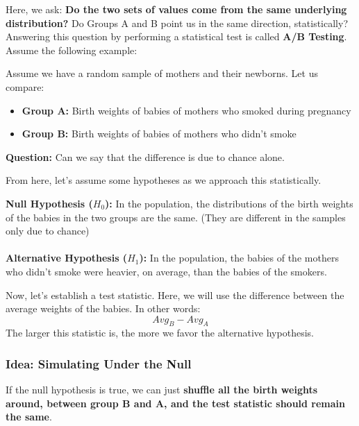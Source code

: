 \documentclass[english, 10pt]{article}
\begin{document}
Here, we ask: \textbf{Do the two sets of values come from the same underlying distribution?} Do Groups A and B point us in the same direction, statistically?\\

Answering this question by performing a statistical test is called \textbf{A/B Testing}.\\

Assume the following example:\\

\begin{myproof}
Assume we have a random sample of mothers and their newborns. Let us compare:
\begin{itemize}
	\item \textbf{Group A:} Birth weights of babies of mothers who smoked during pregnancy
	\item \textbf{Group B:} Birth weights of babies of mothers who didn't smoke
\end{itemize}

\textbf{Question:} Can we say that the difference is due to chance alone.
\end{myproof}

\hfill \break From here, let's assume some hypotheses as we approach this statistically.\\

\begin{myproof}
\textbf{Null Hypothesis ($H_0$):} In the population, the distributions of the birth weights of the babies in the two groups are the same. (They are different in the samples only due to chance)\\\\
\textbf{Alternative Hypothesis ($H_1$):} In the population, the babies of the mothers who didn't smoke were heavier, on average, than the babies of the smokers.
\end{myproof}

\hfill \break Now, let's establish a test statistic. Here, we will use the difference between the average weights of the babies. In other words: $$ Avg_{B} - Avg_{A} $$ The larger this statistic is, the more we favor the alternative hypothesis.\\

\subsubsection{Idea: Simulating Under the Null}

If the null hypothesis is true, we can just \textbf{shuffle all the birth weights around, between group B and A, and the test statistic should remain the same}.\\
\end{document}
